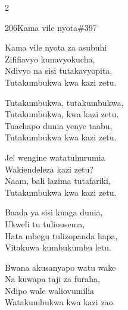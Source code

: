 \documentclass{article}
\begin{document}
\begin{multicols}{2}
\begin{hymn}{206}{Kama vile nyota}{\#397}
\begin{stanza}
Kama vile nyota za asubuhi\\
Zififiavyo kunavyokucha,\\
Ndivyo na sisi tutakavyopita,\\
Tutakumbukwa kwa kazi zetu.
\end{stanza}
\begin{chorus}
Tutakumbukwa, tutakumbukwa,\\
Tutakumbukwa, kwa kazi zetu.\\
Tuachapo dunia yenye taabu,\\
Tutakumbukwa kwa kazi zetu.
\end{chorus}
\begin{stanza}
Je! wengine watatuhurumia\\
Wakiendeleza kazi zetu?\\
Naam, bali lazima tutafariki,\\
Tutakumbukwa kwa kazi zetu.
\end{stanza}
\begin{stanza}
Baada ya sisi kuaga dunia,\\
Ukweli tu tuliousema,\\
Hata mbegu tulizopanda hapa,\\
Vitakuwa kumbukumbu letu.
\end{stanza}
\begin{stanza}
Bwana akusanyapo watu wake\\
Na kuwapa taji za furaha,\\
Ndipo wale waliovumilia\\
Watakumbukwa kwa kazi zao.
\end{stanza}
\end{hymn}


\end{multicols}
\end{document}
